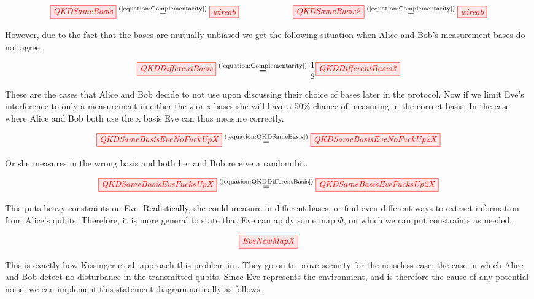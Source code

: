 \documentclass[]{article}
\newcommand{\equaltext}[1]{\ensuremath{\stackrel{\text{#1}}{=}}}
\begin{document}
\begin{equation}
	\label{equation:QKDSameBasis}
	\tikzfig{QKDSameBasis} \equaltext{(\ref{equation:Complementarity})} \tikzfig{wireab} ~~~~~~~~~~~~~~~~~~~ \tikzfig{QKDSameBasis2} \equaltext{(\ref{equation:Complementarity})} \tikzfig{wireab}
\end{equation}

However, due to the fact that the bases are mutually unbiased we get the following situation when Alice and Bob's measurement bases do not agree.

\begin{equation}
\label{equation:QKDDifferentBasis}
\tikzfig{QKDDifferentBasis} \equaltext{(\ref{equation:Complementarity})} \frac{1}{2} \tikzfig{QKDDifferentBasis2}
\end{equation}

These are the cases that Alice and Bob decide to not use upon discussing their choice of bases later in the protocol.
\newpage
Now if we limit Eve's interference to only a measurement in either the z or x bases she will have a 50\% chance of measuring in the correct basis. In the case where Alice and Bob both use the x basis Eve can thus measure correctly.

\begin{equation}
	\tikzfig{QKDSameBasisEveNoFuckUpX} \equaltext{(\ref{equation:QKDSameBasis})} \tikzfig{QKDSameBasisEveNoFuckUp2X} 
\end{equation}

Or she measures in the wrong basis and both her and Bob receive a random bit.

\begin{equation}
	\tikzfig{QKDSameBasisEveFucksUpX} \equaltext{(\ref{equation:QKDDifferentBasis})} \tikzfig{QKDSameBasisEveFucksUp2X}
\end{equation}

This puts heavy constraints on Eve. Realistically, she could measure in different bases, or find even different ways to extract information from Alice's qubits. Therefore, it is more general to state that Eve can apply some map $\Phi$, on which we can put constraints as needed.

\begin{equation}
	\label{equation:EveNewMap}
	\tikzfig{EveNewMapX}
\end{equation}

This is exactly how Kissinger et al. approach this problem in \cite{Kissinger2017}. They go on to prove security for the noiseless case; the case in which Alice and Bob detect no disturbance in the transmitted qubits. Since Eve represents the environment, and is therefore the cause of any potential noise, we can implement this statement diagrammatically as follows.
\end{document}
